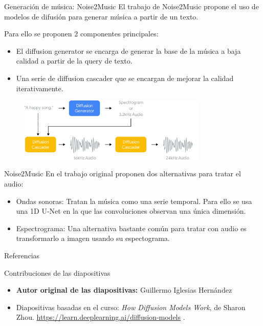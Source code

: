 \begin{frame}{Generación de música: Noise2Music}
El trabajo de \alert{Noise2Music} \cite{huang2023noise2music} propone el uso de modelos de difusión para \alert{generar música} a partir de un \alert{texto}.

Para ello se proponen 2 componentes principales:

\begin{itemize}
    \item El \alert{diffusion generator} se encarga de generar la \alert{base de la música} a baja calidad a partir de la \alert{query de texto}.
    \item Una serie de \alert{diffusion cascader} que se encargan de mejorar la \alert{calidad} iterativamente.
\end{itemize}

\begin{figure}
    \centering
    \includegraphics[width=0.8\textwidth]{figures/Diffusion_Models/Noise2Music.png}
    \caption{\cite{huang2023noise2music}}
\end{figure}
\end{frame}

\begin{frame}{Noise2Music}
En el trabajo original proponen dos alternativas para tratar el audio:
\begin{itemize}
    \item \alert{Ondas sonoras}: Tratan la música como una serie temporal. Para ello se usa 
    una \alert{1D U-Net} en la que las convoluciones observan una única dimensión.
    
    \item \alert{Espectrograma}: Una alternativa bastante común para tratar con audio es transformarlo a imagen usando su \alert{espectograma}.
\end{itemize}
\end{frame}


\begin{frame}[allowframebreaks]{Referencias}
    
    
\end{frame}

\begin{frame}{Contribuciones de las diapositivas}
\begin{itemize}
    \item \textbf{Autor original de las diapositivas:} Guillermo Iglesias Hernández
    \item Diapositivas basadas en el curso: \textit{How Diffusion Models Work}, de Sharon Zhou. \url{https://learn.deeplearning.ai/diffusion-models} \cite{DeepLearningDifussionModelCourse}.
\end{itemize}
\end{frame}

